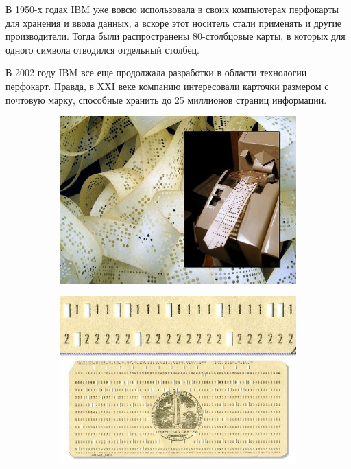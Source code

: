 \documentclass[a4paper, 14pt]{extarticle}
\begin{document}
В 1950-х годах IBM уже вовсю использовала в своих компьютерах перфокарты для хранения и ввода данных, а вскоре этот носитель стали применять и другие производители. Тогда были распространены 80-столбцовые карты, в которых для одного символа отводился отдельный столбец. 

В 2002 году IBM все еще продолжала разработки в области технологии перфокарт. Правда, в XXI веке компанию интересовали карточки размером с почтовую марку, способные хранить до 25 миллионов страниц информации.

\begin{figure}[h]
	\centering
	\begin{subfigure}[b]{0.45\textwidth}
		\centering
		\includegraphics[width=\textwidth]{img/img1.jpg}
	\end{subfigure}
	\begin{subfigure}[b]{0.45\textwidth}
		\centering
		\includegraphics[width=\textwidth]{img/img2.jpg}
	\end{subfigure}
\end{figure}
\end{document}
